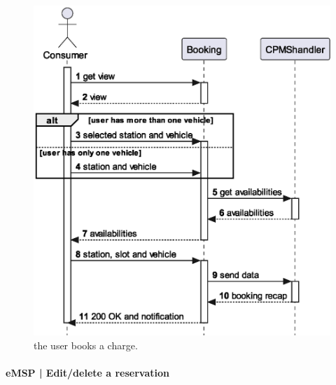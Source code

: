 \begin{figure}[h!]
    \centering
    \includegraphics[width=0.5\columnwidth]{./images/diagrams/sequences/emsp/book}
    \caption{the user books a charge.}
\end{figure}

\pagebreak

\paragraph{eMSP | Edit/delete a reservation}

